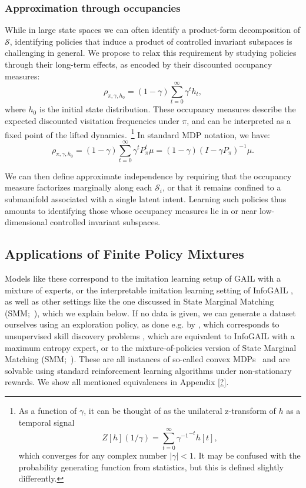 \documentclass{article}
\theoremstyle{plain}
\theoremstyle{definition}
\theoremstyle{remark}
\newcommand{\sS}{\mathcal{S}}
\begin{document}
\subsubsection{Approximation through occupancies}
While in large state spaces we can often identify a product-form decomposition of $\sS$, identifying policies that induce a product of controlled invariant subspaces is challenging in general. We propose to relax this requirement by studying policies through their long-term effects, as encoded by their discounted occupancy measures:
\begin{equation}
    \rho_{\pi,\gamma,h_0} = (1-\gamma)\sum_{t=0}^\infty \gamma^t h_t,
\end{equation}
where $h_0$ is the initial state distribution.
These occupancy measures describe the expected discounted visitation frequencies under $\pi$, and can be interpreted as a fixed point of the lifted dynamics.~\footnote{As a function of $\gamma$, it can be thought of as the unilateral z-transform of $h$ as a temporal signal $$Z[h]\left(1/\gamma\right) = \sum_{t=0}^\infty {\gamma^{-1}}^{-t} h[t],$$ which converges for any complex number $|\gamma|<1$. It may be confused with the probability generating function from statistics, but this is defined slightly differently.}
In standard MDP notation, we have:
\begin{equation}
\rho_{\pi,\gamma,h_0} = (1 - \gamma) \sum_{t=0}^\infty \gamma^t P_\pi^t \mu = (1 - \gamma)(I - \gamma P_\pi)^{-1} \mu.
\end{equation}

We can then define approximate independence by requiring that the occupancy measure  factorizes marginally along each $\sS_i$, or that it remains confined to a submanifold associated with a single latent intent. Learning such policies thus amounts to identifying those whose occupancy measures lie in or near low-dimensional controlled invariant subspaces.

\subsection{Applications of Finite Policy Mixtures}

Models like these correspond to the imitation learning setup of GAIL \citep{ho2016generativeadversarialimitationlearning} with a mixture of experts, or the interpretable imitation learning setting of InfoGAIL \citep{InfoGAIL}, as well as other settings like the one discussed in State Marginal Matching (SMM;~\citep{?}), which we explain below.
If no data is given, we can generate a dataset ourselves using an exploration policy, as done e.g. by \citep{campos2020explore}, which corresponds to unsupervised skill discovery problems \citep{gregor2016variational, eysenbach2018diversity, achiam2018variational, hansen2019fast, liu2021behavior, laskin2022cic}, which are equivalent to InfoGAIL with a maximum entropy expert, or to the mixture-of-policies version of State Marginal Matching (SMM;~\citep{?}).
These are all instances of so-called convex MDPs~\citep{zahavy2021reward} and are solvable using standard reinforcement learning algorithms under non-stationary rewards. We show all mentioned equivalences in Appendix \ref{?}.
\end{document}
